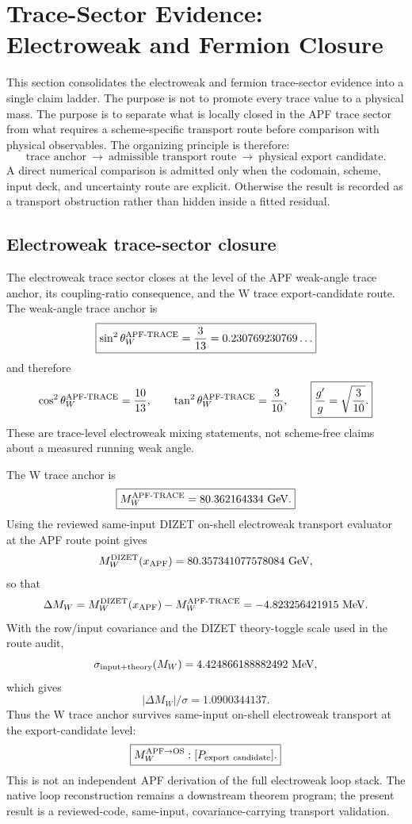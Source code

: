 
\section{Trace-Sector Evidence: Electroweak and Fermion Closure}
\label{sec:trace-sector-evidence}

This section consolidates the electroweak and fermion trace-sector evidence into a single claim ladder.  The purpose is not to promote every trace value to a physical mass.  The purpose is to separate what is locally closed in the APF trace sector from what requires a scheme-specific transport route before comparison with physical observables.  The organizing principle is therefore:
\[
\boxed{\text{trace anchor}\ \longrightarrow\ \text{admissible transport route}\ \longrightarrow\ \text{physical export candidate}.}
\]
A direct numerical comparison is admitted only when the codomain, scheme, input deck, and uncertainty route are explicit.  Otherwise the result is recorded as a transport obstruction rather than hidden inside a fitted residual.

\subsection{Electroweak trace-sector closure}
\label{subsec:ew-trace-sector-closure}

The electroweak trace sector closes at the level of the APF weak-angle trace anchor, its coupling-ratio consequence, and the W trace export-candidate route.  The weak-angle trace anchor is
\[
\boxed{
\sin^2\theta_W^{\rm APF\text{-}TRACE}=\frac{3}{13}=0.230769230769\ldots
}
\]
and therefore
\[
\cos^2\theta_W^{\rm APF\text{-}TRACE}=\frac{10}{13},
\qquad
\tan^2\theta_W^{\rm APF\text{-}TRACE}=\frac{3}{10},
\qquad
\boxed{\frac{g'}{g}=\sqrt{\frac{3}{10}}.}
\]
These are trace-level electroweak mixing statements, not scheme-free claims about a measured running weak angle.

The W trace anchor is
\[
\boxed{
M_W^{\rm APF\text{-}TRACE}=80.362164334\ {\rm GeV}.
}
\]
Using the reviewed same-input DIZET on-shell electroweak transport evaluator at the APF route point gives
\[
M_W^{\rm DIZET}(x_{\rm APF})=80.357341077578084\ {\rm GeV},
\]
so that
\[
\Delta M_W
=
M_W^{\rm DIZET}(x_{\rm APF})-M_W^{\rm APF\text{-}TRACE}
=-4.823256421915\ {\rm MeV}.
\]
With the row/input covariance and the DIZET theory-toggle scale used in the route audit,
\[
\sigma_{\rm input+theory}(M_W)=4.424866188882492\ {\rm MeV},
\]
which gives
\[
\boxed{
|\Delta M_W|/\sigma = 1.0900344137.
}
\]
Thus the W trace anchor survives same-input on-shell electroweak transport at the export-candidate level:
\[
\boxed{
M_W^{\rm APF\to OS}:[P_{\rm export\ candidate}].
}
\]
This is not an independent APF derivation of the full electroweak loop stack.  The native loop reconstruction remains a downstream theorem program; the present result is a reviewed-code, same-input, covariance-carrying transport validation.


